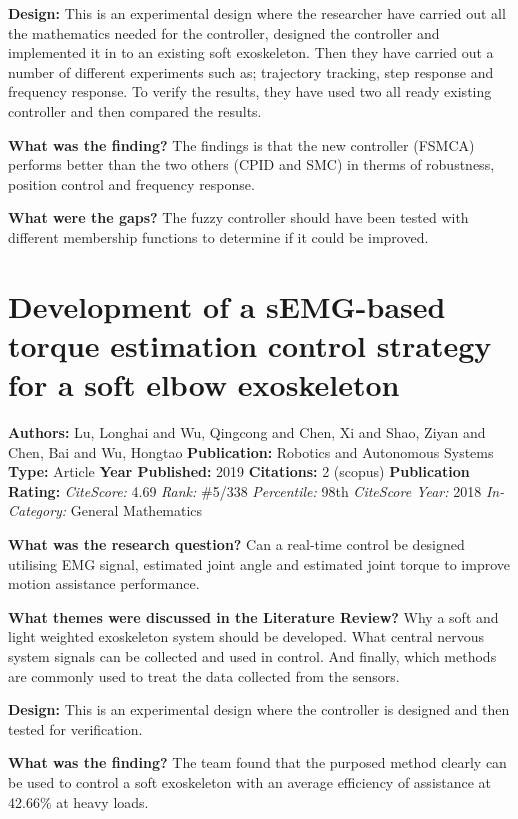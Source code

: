 \textbf{Design:}  
This is an experimental design where the researcher have carried out all the mathematics needed for the controller, designed the controller and implemented it in to an existing soft exoskeleton. Then they have carried out a number of different experiments such as; trajectory tracking, step response and frequency response. To verify the results, they have used two all ready existing controller and then compared the results. 

\textbf{What was the finding?} 
The findings is that the new controller (FSMCA) performs better than the two others (CPID and SMC) in therms of robustness, position control and frequency response.  

\textbf{What were the gaps?}
The fuzzy controller should have been tested with different membership functions to determine if it could be improved. 
 

\section{Development of a sEMG-based torque estimation control strategy for a soft elbow exoskeleton} 
\textbf{Authors:} Lu, Longhai and Wu, Qingcong and Chen, Xi and Shao, Ziyan and Chen, Bai and Wu, Hongtao \newline
\textbf{Publication:} Robotics and Autonomous Systems 
\textbf{Type:} Article  \newline
\textbf{Year Published:} 2019
\textbf{Citations:} 2 (scopus) \newline 
\textbf{Publication Rating:}    
\textit{CiteScore:} 4.69 \textit{Rank:} \#5/338 \textit{Percentile:} 98th  \newline
\textit{CiteScore Year:} 2018
\textit{In-Category:} General Mathematics

\textbf{What was the research question?} 
Can a real-time control be designed utilising EMG signal, estimated joint angle and estimated joint torque to improve motion assistance performance. 

\textbf{What themes were discussed in the Literature Review?}  
Why a soft and light weighted exoskeleton system should be developed. What central nervous system signals can be collected and used in control. And finally, which methods are commonly used to treat the data collected from the sensors. 

\textbf{Design:}  
This is an experimental design where the controller is designed and then tested for verification. 

\textbf{What was the finding?} 
The team found that the purposed method clearly can be used to control a soft exoskeleton with an average efficiency of assistance at 42.66\% at heavy loads. 

